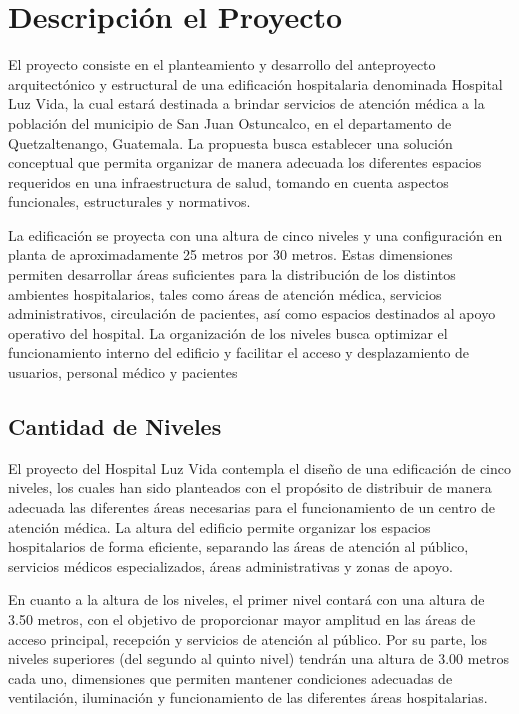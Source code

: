 \documentclass[14pt,letterpaper]{extarticle}
\begin{document}
	\section{Descripción el Proyecto}
	El proyecto consiste en el planteamiento y desarrollo del anteproyecto arquitectónico y estructural de una edificación hospitalaria denominada Hospital Luz Vida, la cual estará destinada a brindar servicios de atención médica a la población del municipio de San Juan Ostuncalco, en el departamento de Quetzaltenango, Guatemala. La propuesta busca establecer una solución conceptual que permita organizar de manera adecuada los diferentes espacios requeridos en una infraestructura de salud, tomando en cuenta aspectos funcionales, estructurales y normativos.

	
	La edificación se proyecta con una altura de cinco niveles y una configuración en planta de aproximadamente 25 metros por 30 metros. Estas dimensiones permiten desarrollar áreas suficientes para la distribución de los distintos ambientes hospitalarios, tales como áreas de atención médica, servicios administrativos, circulación de pacientes, así como espacios destinados al apoyo operativo del hospital. La organización de los niveles busca optimizar el funcionamiento interno del edificio y facilitar el acceso y desplazamiento de usuarios, personal médico y pacientes
	\newpage
	
	\subsection{Cantidad de Niveles}
	El proyecto del Hospital Luz Vida contempla el diseño de una edificación de cinco niveles, los cuales han sido planteados con el propósito de distribuir de manera adecuada las diferentes áreas necesarias para el funcionamiento de un centro de atención médica. La altura del edificio permite organizar los espacios hospitalarios de forma eficiente, separando las áreas de atención al público, servicios médicos especializados, áreas administrativas y zonas de apoyo.
	
	En cuanto a la altura de los niveles, el primer nivel contará con una altura de 3.50 metros, con el objetivo de proporcionar mayor amplitud en las áreas de acceso principal, recepción y servicios de atención al público. Por su parte, los niveles superiores (del segundo al quinto nivel) tendrán una altura de 3.00 metros cada uno, dimensiones que permiten mantener condiciones adecuadas de ventilación, iluminación y funcionamiento de las diferentes áreas hospitalarias.
	\newpage
	
\end{document}
